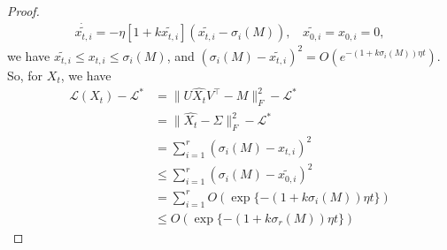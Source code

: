 \begin{proof}
\begin{align}
        \dot{\tilde{x_{t,i}}}=-\eta\left[1+k\tilde{x_{t,i}}\right](\tilde{x_{t,i}}-\sigma_i(M)),~~~~\tilde{x_{0,i}}=x_{0,i}=0,
    \end{align}
    we have $\tilde{x_{t,i}}\leq x_{t,i}\leq \sigma_i(M)$, and $(\sigma_i(M)-\tilde{x_{t,i}})^2=O(e^{-(1+k\sigma_i(M))\eta t})$. So, for $X_t$, we have
    \begin{align}
        \mathcal{L}(X_t)-\mathcal{L}^*&=\|U\hat{X_t}V^\top-M\|_F^2-\mathcal{L}^*\\
        &=\|\hat{X_t}-\Sigma\|_F^2-\mathcal{L}^*\\
        &=\sum_{i=1}^r(\sigma_i(M)-x_{t,i})^2\\
        &\leq\sum_{i=1}^r(\sigma_i(M)-\tilde{x_{0,i}})^2\\
        &=\sum_{i=1}^rO(\exp\{-(1+k\sigma_i(M))\eta t\})\\
        &\leq O(\exp\{-(1+k\sigma_r(M))\eta t\})
    \end{align}
    
\end{proof}




